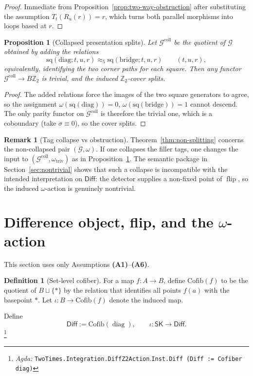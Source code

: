 \documentclass{article}
\newcommand{\SK}{\mathsf{SK}}
\newcommand{\Diff}{\mathsf{Diff}}
\newcommand{\diag}{\operatorname{diag}}
\newcommand{\flip}{\operatorname{flip}}
\newcommand{\Ztwo}{\mathbb{Z}_2}
\newcommand{\Agda}[1]{\texttt{#1}}
\newcommand{\AgdaRef}[2]{\emph{Agda: }\Agda{#1}.\Agda{#2}}
\newcommand{\AgdaNote}[2]{\footnote{\AgdaRef{#1}{#2}}}
\theoremstyle{definition}
\newtheorem{definition}{Definition}[section]
\newtheorem{remark}{Remark}[section]
\theoremstyle{plain}
\newtheorem{proposition}{Proposition}[section]
\begin{document}
\begin{proof}
Immediate from Proposition~\ref{prop:two-way-obstruction} after substituting the
assumption $T_t(R_u(r))=r$, which turns both parallel morphisms into loops based at $r$.
\end{proof}

\begin{proposition}[Collapsed presentation splits]
\label{prop:collapsed-splits}
Let $\mathcal G^{\mathrm{coll}}$ be the quotient of $\mathcal G$ obtained by adding the relations
\[
\mathrm{sq}(\mathrm{diag};t,u,r)\approx_5 \mathrm{sq}(\mathrm{bridge};t,u,r)\qquad (t,u,r),
\]
equivalently, identifying the two corner paths for each square. Then any functor
$\mathcal G^{\mathrm{coll}}\to B\Ztwo$ is trivial, and the induced $\Ztwo$-cover splits.
\end{proposition}

\begin{proof}
The added relations force the images of the two square generators to agree, so the
assignment $\omega(\mathrm{sq}(\mathrm{diag}))=0$, $\omega(\mathrm{sq}(\mathrm{bridge}))=1$
cannot descend. The only parity functor on $\mathcal G^{\mathrm{coll}}$ is therefore the
trivial one, which is a coboundary (take $\sigma\equiv 0$), so the cover splits.
\end{proof}

\begin{remark}[Tag collapse vs obstruction]
\label{rem:limited-scope-theorem-translation-006}
Theorem~\ref{thm:non-splitting} concerns the non-collapsed pair $(\mathcal G,\omega)$.
If one collapses the filler tags, one changes the input to $(\mathcal G^{\mathrm{coll}},
\omega_{\mathrm{triv}})$ as in Proposition~\ref{prop:collapsed-splits}. The semantic
package in Section~\ref{sec:nontrivial} shows that such a collapse is incompatible with
the intended interpretation on $\Diff$: the detector supplies a non-fixed point of $\flip$,
so the induced $\omega$-action is genuinely nontrivial.
\end{remark}

\section{Difference object, flip, and the $\omega$-action}
\label{sec:diff}
This section uses only Assumptions \textbf{(A1)}--\textbf{(A6)}.

\begin{definition}[Set-level cofiber]
\label{def:limited-scope-theorem-translation-006}
For a map $f:A\to B$, define $\mathrm{Cofib}(f)$ to be the quotient of
$B\sqcup\{\ast\}$ by the relation that identifies all points $f(a)$ with the basepoint
$\ast$. Let $\iota:B\to\mathrm{Cofib}(f)$ denote the induced map.

Define
\[\Diff:=\mathrm{Cofib}(\diag),\qquad \iota:\SK\to\Diff.\]
\AgdaNote{TwoTimes.Integration.DiffZ2Action}{Inst.Diff (Diff := Cofiber diag)}
\end{definition}
\end{document}
